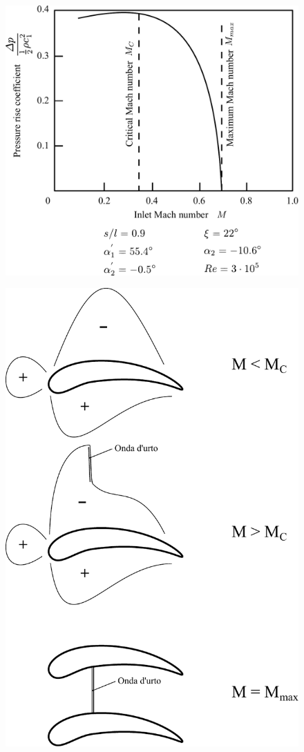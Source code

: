 \begin{figure}[h!]
\centering
\begin{minipage}{.6\textwidth}
  \centering
  \includegraphics[width=.95\linewidth]{fig/FuoriProg2.pdf}
  \label{fig:FuoriProg2}
\end{minipage}%
\begin{minipage}{.4\textwidth}
  \centering
  \includegraphics[width=.95\linewidth]{fig/FuoriProgMach.pdf}

\end{minipage}
\end{figure}
